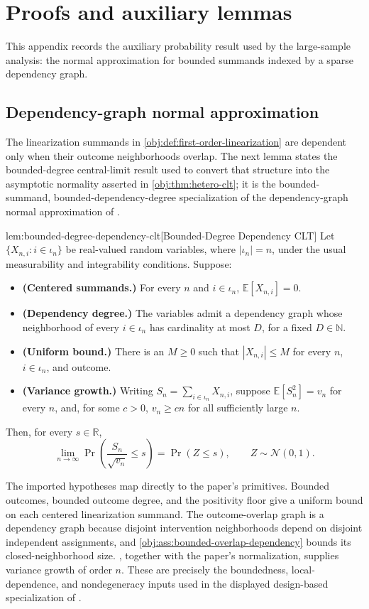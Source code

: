 \section{Proofs and auxiliary lemmas}

This appendix records the auxiliary probability result used by the large-sample analysis: the normal approximation for bounded summands indexed by a sparse dependency graph.

\subsection{Dependency-graph normal approximation}

The linearization summands in \cref{obj:def:first-order-linearization} are dependent only when their outcome neighborhoods overlap. The next lemma states the bounded-degree central-limit result used to convert that structure into the asymptotic normality asserted in \cref{obj:thm:hetero-clt}; it is the bounded-summand, bounded-dependency-degree specialization of the dependency-graph normal approximation of \citet{BaldiRinott1989}.

\begin{lemmav}{lem:bounded-degree-dependency-clt}[Bounded-Degree Dependency CLT]
Let \(\{X_{n,i}: i\in\iota_n\}\) be real-valued random variables, where \(|\iota_n|=n\), under the usual measurability and integrability conditions. Suppose:
\begin{itemize}
\item \textbf{(Centered summands.)} For every \(n\) and \(i\in\iota_n\), \(\mathbb E[X_{n,i}]=0\).
\item \textbf{(Dependency degree.)} The variables admit a dependency graph whose neighborhood of every \(i\in\iota_n\) has cardinality at most \(D\), for a fixed \(D\in\mathbb N\).
\item \textbf{(Uniform bound.)} There is an \(M\ge 0\) such that \(|X_{n,i}|\le M\) for every \(n\), \(i\in\iota_n\), and outcome.
\item \textbf{(Variance growth.)} Writing \(S_n=\sum_{i\in\iota_n}X_{n,i}\), suppose \(\mathbb E[S_n^2]=v_n\) for every \(n\), and, for some \(c>0\), \(v_n\ge cn\) for all sufficiently large \(n\).
\end{itemize}
Then, for every \(s\in\mathbb R\),
\[
\lim_{n\to\infty}\Pr\!\left(\frac{S_n}{\sqrt{v_n}}\le s\right)
=
\Pr\!\left(Z\le s\right),
\qquad Z\sim\mathcal N(0,1).
\]
\end{lemmav}

The imported hypotheses map directly to the paper's primitives. Bounded outcomes, bounded outcome degree, and the positivity floor give a uniform bound on each centered linearization summand. The outcome-overlap graph is a dependency graph because disjoint intervention neighborhoods depend on disjoint independent assignments, and \cref{obj:ass:bounded-overlap-dependency} bounds its closed-neighborhood size. , together with the paper's normalization, supplies variance growth of order \(n\). These are precisely the boundedness, local-dependence, and nondegeneracy inputs used in the displayed design-based specialization of \citet{BaldiRinott1989}.

